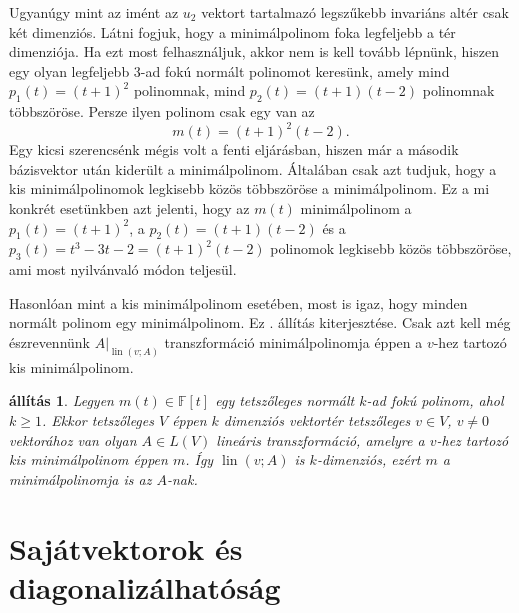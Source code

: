 \documentclass[a4paper, showtrims]{memoir}
\theoremstyle{plain}
\newtheorem{proposition}{állítás}[chapter]
\theoremstyle{remark}
\theoremstyle{definition}
\DeclareMathOperator{\lin}{lin}
\begin{document}
Ugyanúgy mint az imént az $u_2$ vektort tartalmazó legszűkebb invariáns altér csak két dimenziós.
Látni fogjuk, hogy a minimálpolinom foka legfeljebb a tér dimenziója. 
Ha ezt most felhasználjuk, akkor nem is kell tovább lépnünk, hiszen egy olyan legfeljebb 3-ad fokú normált polinomot keresünk, amely mind $p_1\left( t \right)=\left( t+1 \right)^2$ polinomnak,
mind $p_2\left( t \right)=\left( t+1 \right)\left( t-2 \right)$ polinomnak többszöröse.
Persze ilyen polinom csak egy van az
\[
    m\left( t \right)=\left( t+1 \right)^2\left( t-2 \right).
\]
Egy kicsi szerencsénk mégis volt a fenti eljárásban, 
hiszen már a második bázisvektor után kiderült a minimálpolinom. 
Általában csak azt tudjuk, hogy a kis minimálpolinomok legkisebb közös többszöröse a minimálpolinom.
Ez a mi konkrét esetünkben azt jelenti, 
hogy az $m(t)$ minimálpolinom a $p_1(t)=\left( t+1 \right)^2$, 
a $p_2\left( t \right)=(t+1)(t-2)$ és a $p_3(t)=t^3-3t-2=\left( t+1 \right)^2\left( t-2 \right)$ polinomok legkisebb közös többszöröse, ami most nyilvánvaló módon teljesül.

Hasonlóan mint a kis minimálpolinom esetében, most is igaz, hogy minden normált polinom egy minimálpolinom.
Ez . állítás kiterjesztése. 
Csak azt kell még észrevennünk $A|_{\lin\left( v;A \right)}$ transzformáció minimálpolinomja éppen a $v$-hez tartozó
kis minimálpolinom.
\begin{proposition}\label{pr:polinom-minimalpolinom}
    Legyen $m\left( t \right)\in\mathbb{F}\left[ t \right]$ egy tetszőleges normált $k$-ad fokú polinom, ahol $k\geq 1$.
    Ekkor tetszőleges $V$ éppen $k$ dimenziós vektortér tetszőleges $v\in V$, $v\neq 0$ vektorához van olyan $A\in L\left( V \right)$
    lineáris transzformáció, 
    amelyre a $v$-hez tartozó kis minimálpolinom éppen $m$.
    Így $\lin\left( v;A \right)$ is $k$-dimenziós, ezért $m$ a minimálpolinomja is az $A$-nak.
\end{proposition}
\section{Sajátvektorok és diagonalizálhatóság}
\end{document}
